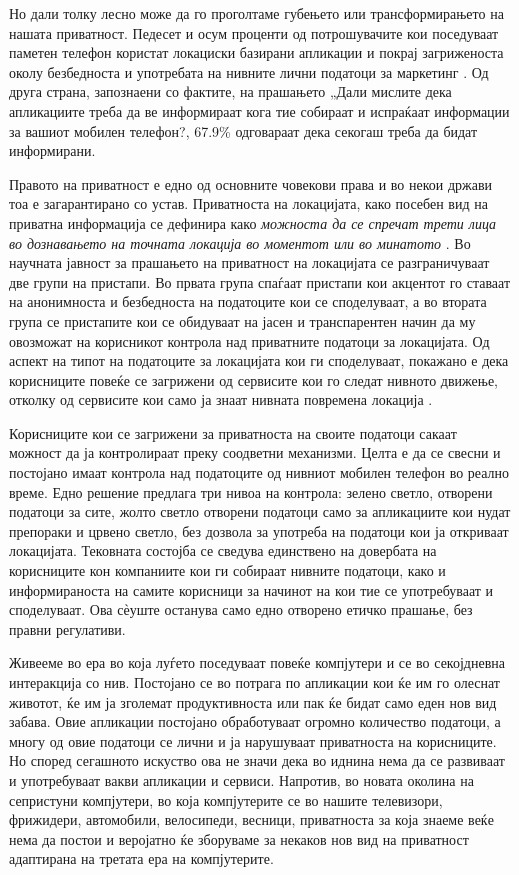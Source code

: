 \documentclass[12pt,a4paper]{article}
\begin{document}
Но дали толку лесно може да го проголтаме губењето или трансформирањето на
нашата приватност. Педесет и осум проценти од потрошувачите кои поседуваат
паметен телефон користат локациски базирани апликации и покрај загриженоста
околу безбедноста и употребата на нивните лични податоци за маркетинг
\cite{locationAppsPopular}. Од друга страна, запознаени со фактите, на прашањето
„Дали мислите дека апликациите треба да ве информираат кога тие собираат и
испраќаат информации за вашиот мобилен телефон?\cite{questionary}, 67.9\%
одговараат дека секогаш треба да бидат информирани.

Правото на приватност е едно од основните човекови права и во некои држави тоа е
загарантирано со устав. Приватноста на локацијата, како посебен вид на приватна
информација се дефинира како \emph{можноста да се спречат трети лица во
дознавањето на точната локација во моментот или во минатото}
\cite{beresford2003location}.  Во научната јавност за прашањето на приватност на
локацијата се разграничуваат две групи на пристапи. Во првата група
\cite{bettini2005protecting,gruteser2003anonymous} спаѓаат пристапи кои акцентот
го ставаат на анонимноста и безбедноста на податоците кои се споделуваат, а во
втората група \cite{smailagic2002location} се пристапите кои се обидуваат на
јасен и транспарентен начин да му овозможат на корисникот контрола над
приватните податоци за локацијата. Од аспект на типот на податоците за
локацијата кои ги споделуваат, покажано е дека корисниците повеќе се загрижени
од сервисите кои го следат нивното движење, отколку од сервисите кои само ја
знаат нивната повремена локација \cite{barkhuus2003location}.

Корисниците кои се загрижени за приватноста на своите податоци сакаат можност да
ја контролираат преку соодветни механизми. Целта е да се свесни и постојано
имаат контрола над податоците од нивниот мобилен телефон во реално време.
Едно решение \cite{forbes} предлага три нивоа на контрола: зелено светло,
отворени податоци за сите, жолто светло отворени податоци само за апликациите
кои нудат препораки и црвено светло, без дозвола за употреба на податоци кои ја
откриваат локацијата. Тековната состојба се сведува единствено на довербата на
корисниците кон компаниите кои ги собираат нивните податоци, како и
информираноста на самите корисници за начинот на кои тие се употребуваат и
споделуваат. Ова сѐуште останува само едно отворено етичко прашање, без правни
регулативи.

Живееме во ера во која луѓето поседуваат повеќе компјутери и се во секојдневна
интеракција со нив. Постојано се во потрага по апликации кои ќе им го
олеснат животот, ќе им ја зголемат продуктивноста или пак ќе бидат само еден нов
вид забава. Овие апликации постојано обработуваат огромно количество податоци, а
многу од овие податоци се лични и ја нарушуваат приватноста на корисниците. Но
според сегашното искуство ова не значи дека во иднина нема да се развиваат и
употребуваат вакви апликации и сервиси. Напротив, во новата околина на
сепристуни компјутери, во која компјутерите се во нашите телевизори, фрижидери,
автомобили, велосипеди, весници, приватноста за која знаеме веќе нема да постои
и веројатно ќе зборуваме за некаков нов вид на приватност адаптирана на третата
ера на компјутерите.



\end{document}
